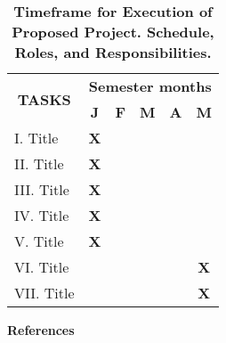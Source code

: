 \documentclass[11pt,letterpaper]{article}
\newcommand{\x}{\cellcolor{lightgray}} %
\begin{document}
\begin{table}[h!]
    \centering
    \caption*{\textbf{Timeframe for Execution of Proposed Project. Schedule, Roles, and Responsibilities.}}
    \begin{tabular}{|l|c|c|c|c|c|}
        \hline
        \multicolumn{1}{|c|}{\multirow{2}{*}{\textbf{TASKS}}}& 
        \multicolumn{5}{|c|}{\textbf{Semester months}}\\
        \cline{2-6}
        &
        \textbf{J}& 
        \textbf{F}& 
        \textbf{M}& 
        \textbf{A}& 
        \textbf{M}
        \\
        \hline
        I. Title
        &\x\textbf{X} 
        & 
        & 
        & 
        & 
        \\
        \hline
        II. Title
        &\x\textbf{X} 
        & 
        & 
        & 
        & 
        \\
        \hline
        III. Title
        &\x\textbf{X} 
        & 
        & 
        & 
        & 
        \\
        \hline
        IV. Title
        &\x\textbf{X} 
        & 
        & 
        & 
        &
        \\
        \hline
        V. Title
        &\x\textbf{X} 
        & 
        & 
        & 
        &  
        \\
        \hline
        VI. Title
        & 
        & 
        & 
        & 
        &\x\textbf{X} 
        \\
        \hline
        VII. Title
        & 
        & 
        & 
        & 
        &\x\textbf{X}
        \\
        \hline
    \end{tabular}
    \label{tab-timeframe}
\end{table}

\newpage

\noindent\textbf{References}

\setlength{\bibhang}{0pt}


\end{document}
